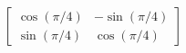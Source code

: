 \documentclass[preview]{standalone}
\begin{document}
\begin{align*}
\begin{bmatrix} \cos(\pi/4) & -\sin(\pi/4) \\ \sin(\pi/4) & \cos(\pi/4) \end{bmatrix}
\end{align*}
\end{document}

